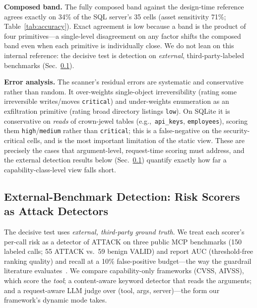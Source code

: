 \documentclass[conference]{IEEEtran}
\newcommand{\eg}{e.g.,\ }
\begin{document}
\noindent\textbf{Composed band.}
The fully composed band against the design-time reference agrees exactly on 34\% of
the SQL server's 35 cells (asset sensitivity 71\%; Table~\ref{tab:accuracy}). Exact
agreement is low because a band is the product of four primitives---a single-level
disagreement on any factor shifts the composed band even when each primitive is
individually close. We do not lean on this internal reference: the decisive test is
detection on \emph{external}, third-party-labeled benchmarks (Sec.~\ref{sec:extdet}).

\noindent\textbf{Error analysis.}
The scanner's residual errors are systematic and conservative rather than random.
It over-weights single-object irreversibility (rating some irreversible
writes/moves \texttt{critical}) and under-weights enumeration as an exfiltration
primitive (rating broad directory listings \texttt{low}). On SQLite it is
conservative on \emph{reads} of crown-jewel tables
(\eg \texttt{api\_keys}, \texttt{employees}), scoring them \texttt{high}/\texttt{medium}
rather than \texttt{critical}; this is a false-negative on the
security-critical cells, and is the most important limitation of the static view.
These are precisely the cases that argument-level, request-time scoring must
address, and the external detection results below (Sec.~\ref{sec:extdet}) quantify
exactly how far a capability-class-level view falls short.

\subsection{External-Benchmark Detection: Risk Scorers as Attack Detectors}
\label{sec:extdet}

The decisive test uses \emph{external, third-party ground truth}. We treat each
scorer's per-call risk as a detector of ATTACK on three public MCP benchmarks
(150 labeled calls; 55 ATTACK vs.\ 59 benign VALID) and report AUC (threshold-free
ranking quality) and recall at a 10\% false-positive budget---the way the guardrail
literature evaluates~\cite{xing2026mcp_guard,xiang2025guardagent}. We compare
capability-only frameworks (CVSS, AIVSS), which score the \emph{tool}; a
content-aware keyword detector that reads the arguments; and a request-aware
LLM judge over (tool, args, server)---the form our framework's dynamic mode takes.
\end{document}
